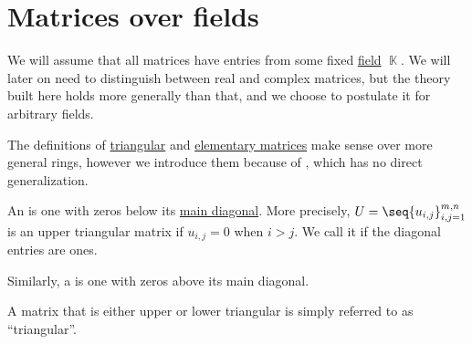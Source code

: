 \section{Matrices over fields}\label{sec:matrices_over_fields}

We will assume that all matrices have entries from some fixed \hyperref[def:field]{field} \( \BbbK \). We will later on need to distinguish between real and complex matrices, but the theory built here holds more generally than that, and we choose to postulate it for arbitrary fields.

The definitions of \hyperref[def:triangular_matrix]{triangular} and \hyperref[def:triangular_matrix]{elementary matrices} make sense over more general rings, however we introduce them because of , which has no direct generalization.

\begin{definition}\label{def:triangular_matrix}
  An  is one with zeros below its \hyperref[def:matrix_diagonal]{main diagonal}. More precisely, \( U = \seq{ u_{i,j} }_{i,j=1}^{m,n} \) is an upper triangular matrix if \( u_{i,j} = 0 \) when \( i > j \). We call it  if the diagonal entries are ones.

  Similarly, a  is one with zeros above its main diagonal.

  A matrix that is either upper or lower triangular is simply referred to as \enquote{triangular}.
\end{definition}

